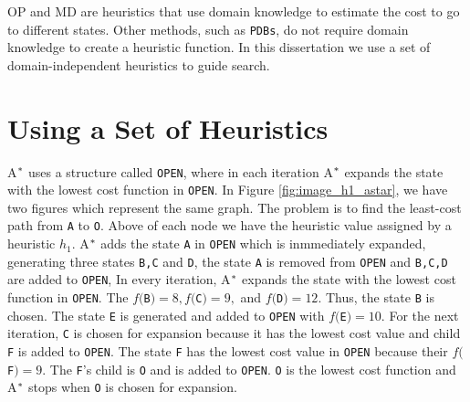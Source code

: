 OP and MD are heuristics that use domain knowledge to estimate the cost to go to different states. Other methods, such as \texttt{PDBs}, do not require domain knowledge to create a heuristic function. In this dissertation we use a set of domain-independent heuristics to guide search. 


%
%


\section{Using a Set of Heuristics}
A$\sp{*}$ uses a structure called \texttt{OPEN}, where in each iteration A$\sp{*}$ expands the state with the lowest cost function in \texttt{OPEN}. In Figure \ref{fig:image_h1_astar}, we have two figures which represent the same graph. The problem is to find the least-cost path from \texttt{A} to \texttt{O}. Above of each node we have the heuristic value assigned by a heuristic $h_{1}$. A$\sp{*}$ adds the state \texttt{A} in \texttt{OPEN} which is inmmediately expanded, generating three states \texttt{B,C} and \texttt{D}, the state \texttt{A} is removed from \texttt{OPEN} and \texttt{B,C,D} are added to \texttt{OPEN}, In every iteration, A$\sp{*}$ expands the state with the lowest cost function in \texttt{OPEN}. The $f($\texttt{B}$)=8, f($\texttt{C}$)=9,$ and $ f($\texttt{D}$)=12$. Thus, the state \texttt{B} is chosen. The state \texttt{E} is generated and added to \texttt{OPEN} with $f($\texttt{E}$)=10$. For the next iteration, \texttt{C} is chosen for expansion because it has the lowest cost value and child \texttt{F} is added to \texttt{OPEN}. The state \texttt{F} has the lowest cost value in \texttt{OPEN} because their $f($\texttt{F}$)=9$. The \texttt{F}'s child is \texttt{O} and is added to \texttt{OPEN}. \texttt{O} is the lowest cost function and A$\sp{*}$ stops when \texttt{O} is chosen for expansion.

